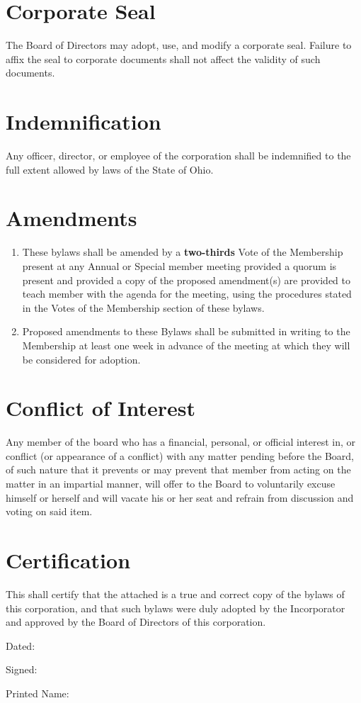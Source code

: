 \documentclass{article}
\begin{document}
\section{Corporate Seal}
  The Board of Directors may adopt, use, and modify a corporate seal.  Failure to affix the
  seal to corporate documents shall not affect the validity of such documents.
\section{Indemnification}
  Any officer, director, or employee of the corporation shall be indemnified to the full extent
  allowed by laws of the State of Ohio.
\section{Amendments}
  \begin{enumerate}
    \item These bylaws shall be amended by a \textbf{two-thirds} Vote of the Membership present at
    any Annual or Special member meeting provided a quorum is present and provided a copy
    of the proposed amendment(s) are provided to teach member with the agenda for the
    meeting, using the procedures stated in the Votes of the Membership section of these
    bylaws.
    \item Proposed amendments to these Bylaws shall be submitted in writing to the
    Membership at least one week in advance of the meeting at which they will be considered
    for adoption.
  \end{enumerate}
\section{Conflict of Interest}
  Any member of the board who has a financial, personal, or official interest in, or conflict
  (or appearance of a conflict) with any matter pending before the Board, of such nature that it
  prevents or may prevent that member from acting on the matter in an impartial manner,
  will offer to the Board to voluntarily excuse himself or herself and will vacate his or her seat
  and refrain from discussion and voting on said item.
\section{Certification}
  This shall certify that the attached is a true and correct copy of the bylaws of this
  corporation, and that such bylaws were duly adopted by the Incorporator and approved by
  the Board of Directors of this corporation.

Dated:

Signed:

Printed Name:
\end{document}
